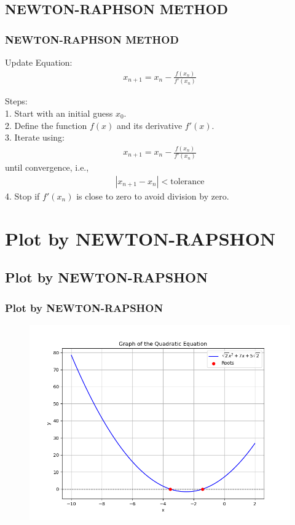\documentclass{beamer}
\theoremstyle{remark}
\providecommand{\abs}[1]{\left\vert#1\right\vert}
\numberwithin{equation}{section}
\begin{document}
\subsection{NEWTON-RAPHSON METHOD}
\begin{frame}
\frametitle{NEWTON-RAPHSON METHOD}

Update Equation:
\begin{align}
 x_{n+1} = x_n - \frac{f(x_n)}{f'(x_n)}   
\end{align}

Steps:\\
1. Start with an initial guess $ x_0 $.\\
2. Define the function \( f(x) \) and its derivative  $f'(x)$.\\
3. Iterate using:
   \begin{align}
   x_{n+1} = x_n - \frac{f(x_n)}{f'(x_n)}
   \end{align}
   until convergence, i.e.,
   \begin{align}
   \abs{x_{n+1} - x_n} < \text{tolerance}
   \end{align}
4. Stop if $f'(x_n)$ is close to zero to avoid division by zero.
\end{frame}

\section{Plot by NEWTON-RAPSHON}
\subsection{Plot by NEWTON-RAPSHON}
\begin{frame}
\frametitle{Plot by NEWTON-RAPSHON}


\begin{figure}[h!]
   \centering
   \includegraphics[width=0.7\linewidth]{figs/Figure_2.png}
\end{figure}

\end{frame}
\end{document}
